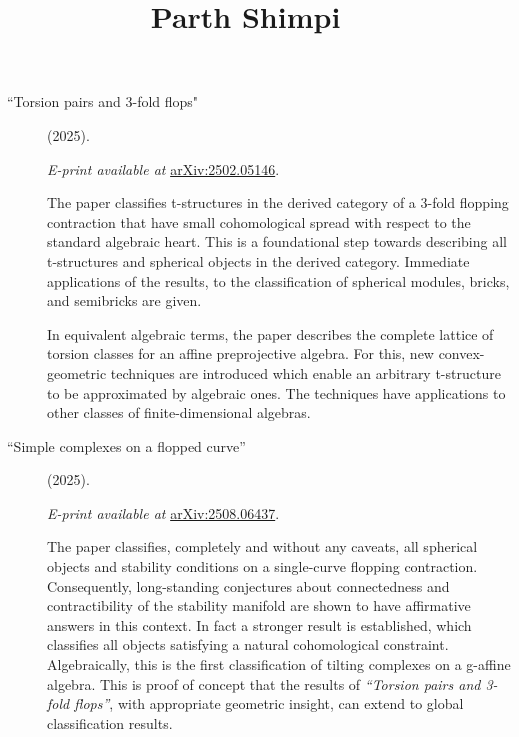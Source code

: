 \documentclass[10pt]{article}
\begin{document}
\title{
	\vspace{-1em}Parth Shimpi\normalsize{}
	\raisebox{-0.1em}{\huge\(\vert\)}
	\normalsize\ 
}
\date{}
\maketitle
\thispagestyle{fancy}
\begin{description}
	\item[``Torsion pairs and 3-fold flops"] (2025).

	      \emph{E-print available at}
	      \href{https://arxiv.org/abs/2502.05146}{arXiv:2502.05146}.

	      The paper classifies t-structures in the derived category of a 3-fold flopping
	      contraction that have small cohomological spread with respect to the standard
	      algebraic heart. This is a foundational step towards describing all
	      t-structures and spherical objects in the derived category. Immediate
	      applications of the results, to the classification of spherical modules,
	      bricks, and semibricks are given.

	      In equivalent algebraic terms, the paper describes the complete lattice of
	      torsion classes for an affine preprojective algebra. For this, new
	      convex-geometric techniques are introduced which enable an arbitrary
	      t-structure to be approximated by algebraic ones. The techniques have
	      applications to other classes of finite-dimensional algebras.

	\item[``Simple complexes on a flopped curve''] (2025).

	      \emph{E-print available at}
	      \href{https://arxiv.org/abs/2508.06437}{arXiv:2508.06437}.

	      The paper classifies, completely and without any caveats, all spherical objects
	      and stability conditions on a single-curve flopping contraction. Consequently,
	      long-standing conjectures about connectedness and contractibility of the
	      stability manifold are shown to have affirmative answers in this context. In
	      fact a stronger result is established, which classifies all objects satisfying
	      a natural cohomological constraint. Algebraically, this is the first
	      classification of tilting complexes on a g-affine algebra. This is proof of
	      concept that the results of \emph{``Torsion pairs and 3-fold flops''}, with
	      appropriate geometric insight, can extend to global classification results.


\end{description}
\end{document}
